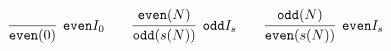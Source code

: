 \documentclass[crop]{standalone} %
\begin{document}
$\displaystyle
\infer[\texttt{even} I_0]{
    \texttt{even}(0)
}{}
\qquad
\infer[\texttt{odd} I_s]{
    \texttt{odd}(s(N))
}{
    \texttt{even}(N)
}
\qquad
\infer[\texttt{even} I_s]{
    \texttt{even}(s(N))
}{
    \texttt{odd}(N)
}
$
\end{document}
